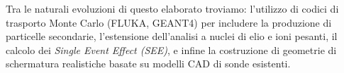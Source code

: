 \documentclass[12pt]{report}
\begin{document}
Tra le naturali evoluzioni di questo elaborato troviamo: l'utilizzo di codici di trasporto Monte Carlo (FLUKA, GEANT4) \cite{ferrari2005fluka} per includere la produzione di particelle secondarie, l'estensione dell'analisi a nuclei di elio e ioni pesanti, il calcolo dei \textit{Single Event Effect (SEE)}, e infine la costruzione di geometrie di schermatura realistiche basate su modelli CAD di sonde esistenti.
\clearpage



\printbibheading[heading=bibintoc, title={Bibliografia}]

\begingroup
\setlength{\bibitemsep}{0pt}
\setlength{\bibhang}{1em}
\scriptsize
\RaggedRight
\printbibliography[heading=none]
\endgroup
\end{document}
